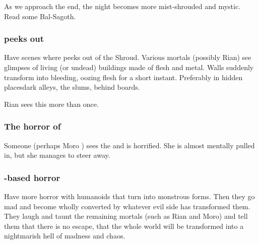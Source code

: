 As we approach the end, the \Malcuric night becomes more mist-shrouded and mystic. 
Read some Bal-Sagoth.





\subsubsection{\Nithdornazsh peeks out}
Have scenes where \Nithdornazsh{} peeks out of the Shroud. 
Various mortals (possibly Rian) see glimpses of living (or undead) buildings made of flesh and metal. 
Walls suddenly transform into bleeding, oozing flesh for a short instant. 
Preferably in hidden places\dash dark alleys, the slums, behind boards.

Rian sees this more than once. 





\subsubsection{The horror of \Nithdornazsh}
Someone (perhaps Moro \Cobrel) sees the  and is horrified. 
She is almost mentally pulled in, but she manages to steer away. 






\subsubsection{\Humanoid-based horror}
Have more horror with humanoids that turn into monstrous forms.
Then they go mad and become wholly converted by whatever evil side has transformed them.
They laugh and taunt the remaining mortals (such as Rian and Moro) and tell them that there is no escape, that the whole world will be transformed into a nightmarish hell of madness and chaos. 

